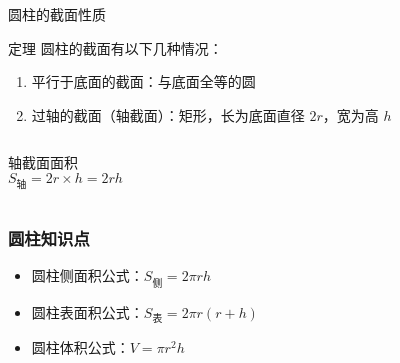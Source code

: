 \begin{frame}{圆柱的截面性质}
    \begin{block}{定理}
        圆柱的截面有以下几种情况：
        \begin{enumerate}
            \item 平行于底面的截面：与底面全等的圆
            \item 过轴的截面（轴截面）：矩形，长为底面直径 \( 2r \)，宽为高 \( h \)
        \end{enumerate}
    \end{block}
    
    \begin{columns}
        \begin{exampleblock}{轴截面面积}
            \[
            S_{\text{轴}} = 2r \times h = 2rh
            \]
        \end{exampleblock}
        
        
    \end{columns}
\end{frame}





\begin{frame}
    \frametitle{圆柱知识点}
    \begin{itemize}
        \item 圆柱侧面积公式：\( S_{\text{侧}} = 2\pi rh \)
        \item 圆柱表面积公式：\( S_{\text{表}} = 2\pi r(r + h) \)
        \item 圆柱体积公式：\( V = \pi r^2 h \)
    \end{itemize}
\end{frame}



